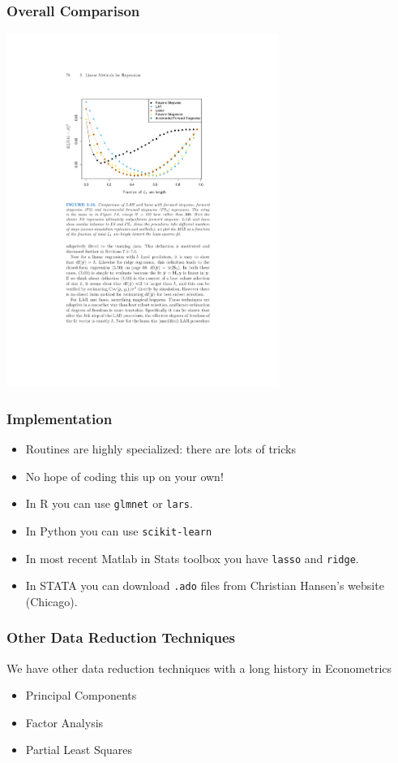 \documentclass[xcolor=pdftex,dvipsnames,table,mathserif,aspectratio=169]{beamer}
\begin{document}
\begin{frame}
\frametitle{Overall Comparison}
\begin{center}
\includegraphics[width=3.5in]{./resources/compareall}
\end{center}
\end{frame}

\begin{frame}
\frametitle{Implementation}
\begin{itemize}
\item Routines are highly specialized: there are lots of tricks
\item No hope of coding this up on your own!
\item In R you can use \texttt{glmnet} or \texttt{lars}.
\item In Python you can use \texttt{scikit-learn}
\item In most recent Matlab in Stats toolbox you have \texttt{lasso} and \texttt{ridge}.
\item In STATA you can download \texttt{.ado} files from Christian Hansen's website (Chicago).
\end{itemize}
\end{frame}

\begin{frame}
\frametitle{Other Data Reduction Techniques}
We have other data reduction techniques with a long history in Econometrics
\begin{itemize}
\item Principal Components
\item Factor Analysis
\item Partial Least Squares
\end{itemize}
\end{frame}
\end{document}
